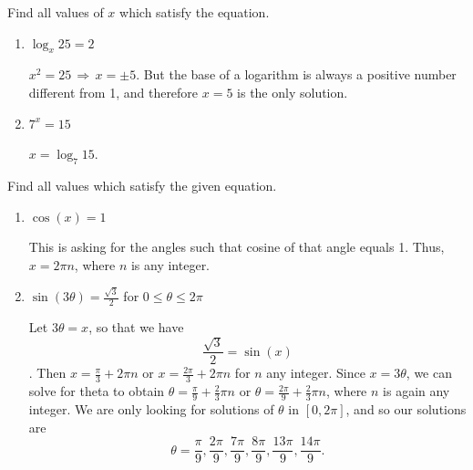 \documentclass[handout,nooutcomes]{ximera}
\begin{document}
\begin{problem}
Find all values of $x$ which satisfy the equation.
	
			\begin{enumerate}
			
			\item  $\log_x 25=2$ 
			
			 \begin{freeResponse}			 
			 $x^2 = 25 \, \Longrightarrow \, x = \pm 5$.  But the base of a logarithm is always a positive number different from 1, and therefore $x = 5$ is the only solution. 
			 \end{freeResponse}
			
			\item  $7^x=15$ 
			
			 \begin{freeResponse}			 
			 $x = \log_{7} 15$. 
			 \end{freeResponse}
			
			\end{enumerate}
			
\end{problem}
			
			

\begin{problem}
Find all values which satisfy the given equation.
	
			\begin{enumerate}
			
			\item  $\cos (x)=1$ 
			
			 \begin{freeResponse}			 
			 This is asking for the angles such that cosine of that angle equals 1.  Thus, $x = 2 \pi n$, where $n$ is any integer.  
			 \end{freeResponse}
			
			\item  $\sin (3 \theta )=\frac{\sqrt{3}}{2}$ for $0 \leq \theta \leq 2\pi $
			
			 \begin{freeResponse}			 
			 Let $3 \theta = x$, so that we have
			$$ \frac{\sqrt{3}}{2} = \sin(x) $$.
			Then $ x= \frac{\pi}{3} + 2 \pi n$ or $ x = \frac{2 \pi }{3} + 2 \pi n $ for $n$ any integer.  Since $x = 3 \theta$, we can solve for theta to obtain $ \theta = \frac{\pi}{9} + \frac{2}{3} \pi n $ or $ \theta = \frac{2 \pi }{9} + \frac{2}{3} \pi n $, where $n$ is again any integer.  We are only looking for solutions of $\theta$ in $[0, 2 \pi ]$, and so our solutions are
$$ \theta = \frac{\pi}{9}, \frac{2\pi}{9}, \frac{7\pi}{9}, \frac{8\pi}{9}, \frac{13\pi}{9}, \frac{14\pi}{9}. $$ 
			 \end{freeResponse}
			
			\end{enumerate}
			
\end{problem}
			
\end{document}
